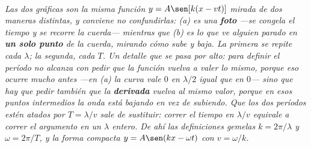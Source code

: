 \begin{center}
\begin{tikzpicture}
\end{tikzpicture}\\[0.5em]
{\small\itshape Las dos gráficas son la misma función $y = A\sen[k(x-vt)]$
mirada de dos maneras distintas, y conviene no confundirlas: (a) es una
\textbf{foto} ---se congela el tiempo y se recorre la cuerda--- mientras que (b)
es lo que ve alguien parado en \textbf{un solo punto} de la cuerda, mirando cómo
sube y baja. La primera se repite cada $\lambda$; la segunda, cada $T$. Un
detalle que se pasa por alto: para definir el período no alcanza con pedir que
la función vuelva a valer lo mismo, porque eso ocurre mucho antes ---en (a) la
curva vale $0$ en $\lambda/2$ igual que en $0$--- sino que hay que pedir también
que la \textbf{derivada} vuelva al mismo valor, porque en esos puntos
intermedios la onda está bajando en vez de subiendo. Que los dos períodos estén
atados por $T = \lambda/v$ sale de sustituir: correr el tiempo en $\lambda/v$
equivale a correr el argumento en un $\lambda$ entero. De ahí las definiciones
gemelas $k = 2\pi/\lambda$ y $\omega = 2\pi/T$, y la forma compacta
$y = A\sen(kx - \omega t)$ con $v = \omega/k$.}
\end{center}
